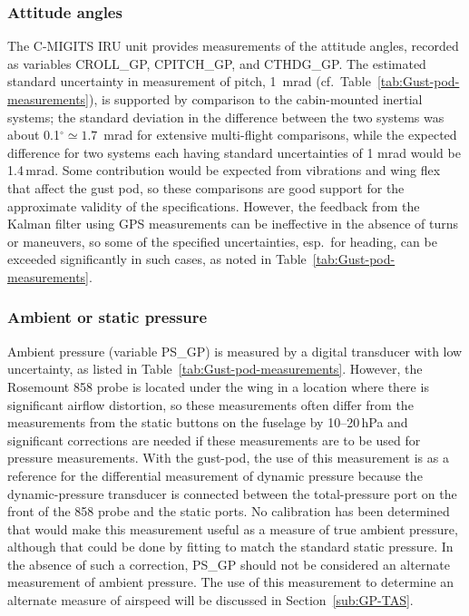 \documentclass[12pt,twoside,english]{article}\usepackage[]{graphicx}\usepackage[]{color}
\let\OrgIndex\index
\renewcommand*{\index}[1]{\OrgIndex{#1}}
\begin{document}
{\subsubsection{Attitude angles}

The C-MIGITS  IRU unit provides measurements of the attitude angles, recorded as variables CROLL\_GP, CPITCH\_GP, and CTHDG\_GP. The estimated standard uncertainty in measurement of pitch, 1~mrad (cf.~Table~\ref{tab:Gust-pod-measurements}), is supported by comparison to the cabin-mounted inertial systems; the standard deviation in the difference between the two systems was about 0.1$^{\circ}\simeq1.7$~mrad for extensive multi-flight comparisons, while the expected difference for two systems each having standard uncertainties of 1 mrad would be 1.4\,mrad. Some contribution would be expected from vibrations and wing flex that affect the gust pod, so these comparisons are good support for the approximate validity of the specifications. However, the feedback from the Kalman filter using GPS measurements can be ineffective in the absence of turns or maneuvers, so some of the specified uncertainties, esp.~for heading, can be exceeded significantly in such cases, as noted in Table~\ref{tab:Gust-pod-measurements}. 


\subsubsection{Ambient or static pressure}

Ambient pressure (variable PS\_GP) is measured by a digital transducer with  low uncertainty, as listed in Table~\ref{tab:Gust-pod-measurements}. However, the Rosemount 858 probe is located under the wing in a location where there is significant airflow distortion, so these measurements often differ from the measurements from the static buttons on the fuselage by 10--20\,hPa and significant corrections are needed if these measurements are to be used for pressure measurements. With the gust-pod, the use of this measurement is as a reference for the differential measurement of dynamic pressure because the dynamic-pressure transducer is connected between the total-pressure port on the front of the 858 probe and the static ports. No calibration has been determined that would make this measurement useful as a measure of true ambient pressure, although that could be done by fitting to match the standard static pressure. In the absence of such a correction, PS\_GP should not be considered an alternate measurement of ambient pressure. The use of this measurement to determine an alternate measure of airspeed will be discussed in Section~\ref{sub:GP-TAS}. 


}
\end{document}
